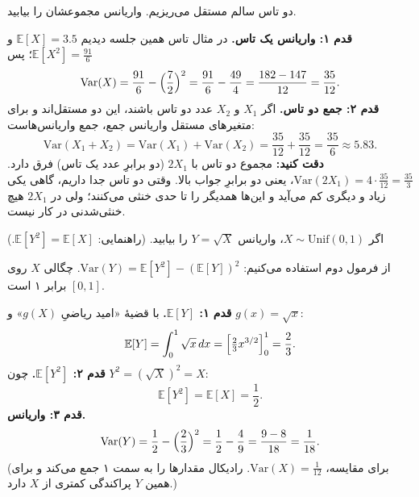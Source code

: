 \begin{exercise}
  دو تاس سالم مستقل می‌ریزیم. واریانس مجموعشان را بیابید.
  \begin{solution}
    \textbf{قدم ۱: واریانس یک تاس.} در مثال تاس همین جلسه دیدیم $\mathbb E[X]=3.5$ و $\mathbb E[X^2]=\frac{91}{6}$؛ پس
    \[ \mathrm{Var}(X)=\frac{91}{6}-\Bigl(\frac72\Bigr)^2=\frac{91}{6}-\frac{49}{4}=\frac{182-147}{12}=\frac{35}{12}. \]
    \textbf{قدم ۲: جمع دو تاس.} اگر $X_1$ و $X_2$ عدد دو تاس باشند، این دو مستقل‌اند و برای متغیرهای مستقل واریانس جمع، جمع واریانس‌هاست:
    \[ \mathrm{Var}(X_1+X_2)=\mathrm{Var}(X_1)+\mathrm{Var}(X_2)=\frac{35}{12}+\frac{35}{12}=\frac{35}{6}\approx5.83. \]
    \textbf{دقت کنید:} مجموع دو تاس با $2X_1$ (دو برابرِ عدد یک تاس) فرق دارد. $\mathrm{Var}(2X_1)=4\cdot\frac{35}{12}=\frac{35}{3}$، یعنی دو برابرِ جواب بالا. وقتی دو تاس جدا داریم، گاهی یکی زیاد و دیگری کم می‌آید و این‌ها همدیگر را تا حدی خنثی می‌کنند؛ ولی در $2X_1$ هیچ خنثی‌شدنی در کار نیست.
  \end{solution}
\end{exercise}

\begin{exercise}
  اگر $X\sim\mathrm{Unif}(0,1)$، واریانس $Y=\sqrt X$ را بیابید. (راهنمایی: $\mathbb E[Y^2]=\mathbb E[X]$.)
  \begin{solution}
    از فرمول دوم استفاده می‌کنیم: $\mathrm{Var}(Y)=\mathbb E[Y^2]-(\mathbb E[Y])^2$. چگالی $X$ روی $[0,1]$ برابر ۱ است.

    \textbf{قدم ۱: $\mathbb E[Y]$.} با قضیهٔ «امید ریاضیِ $g(X)$» و $g(x)=\sqrt x$:
    \[ \mathbb E[Y]=\int_0^1\sqrt x\,dx=\Bigl[\tfrac23x^{3/2}\Bigr]_0^1=\frac23. \]
    \textbf{قدم ۲: $\mathbb E[Y^2]$.} چون $Y^2=(\sqrt X)^2=X$:
    \[ \mathbb E[Y^2]=\mathbb E[X]=\frac12. \]
    \textbf{قدم ۳: واریانس.}
    \[ \mathrm{Var}(Y)=\frac12-\Bigl(\frac23\Bigr)^2=\frac12-\frac49=\frac{9-8}{18}=\frac1{18}. \]
    (برای مقایسه، $\mathrm{Var}(X)=\frac1{12}$. رادیکال مقدارها را به سمت ۱ جمع می‌کند و برای همین $Y$ پراکندگی کمتری از $X$ دارد.)
  \end{solution}
\end{exercise}

